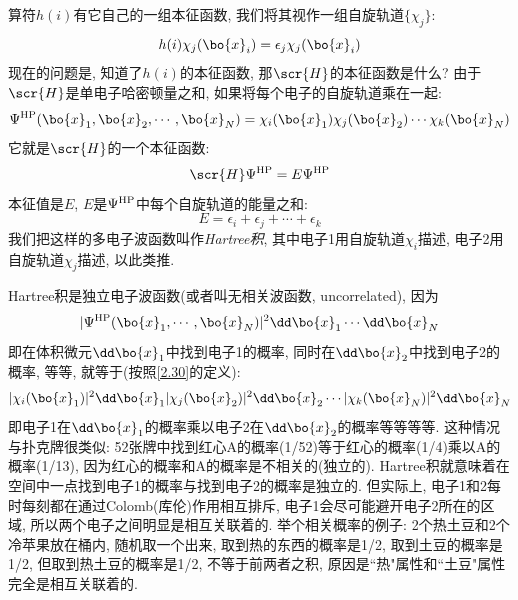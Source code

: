 算符$h(i)$有它自己的一组本征函数, 
我们将其视作一组自旋轨道$\{\chi_j\}$:
\begin{equation}
\label{2.29}
h(i)\chi_j(\bo{x}_i)=\epsilon_j\chi_j(\bo{x}_i)
\end{equation}
现在的问题是, 
知道了$h(i)$的本征函数, 
那$\scr{H}$的本征函数是什么? 由于$\scr{H}$是单电子哈密顿量之和, 
如果将每个电子的自旋轨道乘在一起:
\begin{equation}
\label{2.30}
\Psi^{\rm HP}(\bo{x}_1,\bo{x}_2,\cdots,\bo{x}_N)=\chi_i(\bo{x}_1)\chi_j(\bo{x}_2)\cdots\chi_k(\bo{x}_N)
\end{equation}
它就是$\scr{H}$的一个本征函数:
\begin{equation}
\label{2.31}
\scr{H}\Psi^{\rm HP}=E\Psi^{\rm HP}
\end{equation}
本征值是$E$, 
$E$是$\Psi^{\rm HP}$中每个自旋轨道的能量之和:
\begin{equation}
\label{2.32}
E=\epsilon_i + \epsilon_j + \cdots + \epsilon_k
\end{equation} 
我们把这样的多电子波函数叫作\emph{Hartree积}, 
其中电子1用自旋轨道$\chi_i$描述, 
电子2用自旋轨道$\chi_j$描述, 
以此类推.



Hartree积是独立电子波函数(或者叫无相关波函数, uncorrelated), 因为
\begin{equation*}
|\Psi^{\rm HP}(\bo{x}_1,\cdots,\bo{x}_N)|^2\dd\bo{x}_1\cdots\dd\bo{x}_N
\end{equation*}
即在体积微元$\dd\bo{x}_1$中找到电子1的概率, 
同时在$\dd\bo{x}_2$中找到电子2的概率, 
等等, 
就等于(按照\autoref{2.30}的定义):
\begin{equation*}
|\chi_i(\bo{x}_1)|^2\dd\bo{x}_1|\chi_j(\bo{x}_2)|^2\dd\bo{x}_2\cdots|\chi_k(\bo{x}_N)|^2\dd\bo{x}_N
\end{equation*}
即电子1在$\dd\bo{x}_1$的概率乘以电子2在$\dd\bo{x}_2$的概率等等等等. 
这种情况与扑克牌很类似: 52张牌中找到红心A的概率(1/52)等于红心的概率(1/4)乘以A的概率(1/13), 
因为红心的概率和A的概率是不相关的(独立的). 
Hartree积就意味着在空间中一点找到电子1的概率与找到电子2的概率是独立的. 
但实际上, 
电子1和2每时每刻都在通过Colomb(库伦)作用相互排斥, 
电子1会尽可能避开电子2所在的区域, 
所以两个电子之间明显是相互关联着的. 
举个相关概率的例子: 2个热土豆和2个冷苹果放在桶内, 
随机取一个出来, 
取到热的东西的概率是1/2, 
取到土豆的概率是1/2, 
但取到热土豆的概率是1/2, 
不等于前两者之积, 
原因是``热"属性和``土豆"属性完全是相互关联着的.


